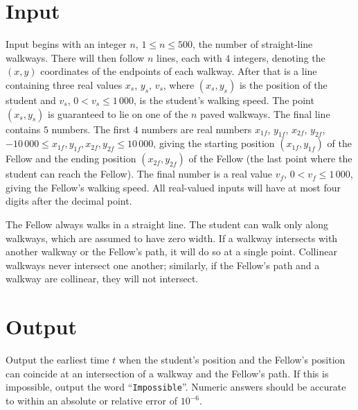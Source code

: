 \section* {Input}
Input begins with an integer $n$, $1 \le n \le 500$, the number of straight-line walkways. There will then follow $n$ lines, each with $4$ integers, denoting the $(x,y)$ coordinates of the endpoints of each walkway. After that is a line containing three real values $x_s$, $y_s$, $v_s$, where $(x_s,y_s)$ is the position of the student and $v_s$, $0 < v_s \leq 1\,000$, is the student's walking
speed. The point $(x_s,y_s)$ is guaranteed to lie on one of the $n$ paved walkways. The final line contains $5$ numbers. The first $4$ numbers are real numbers $x_{1f}$, $y_{1f}$, $x_{2f}$, $y_{2f}$, $-10\,000 \le x_{1f}, y_{1f},x_{2f},y_{2f} \le 10\,000$, giving the starting position $(x_{1f}, y_{1f})$ of the Fellow and the ending position $(x_{2f}, y_{2f})$ of the Fellow (the last point where the student can reach the Fellow). The final number is a real value $v_f$, $0 < v_f \leq 1\,000$, giving the Fellow's walking speed. All real-valued inputs will have at most four digits after the decimal point.

The Fellow always walks in a straight line.  The student can walk only along walkways, which are assumed to have zero width. If a walkway intersects with another walkway or the Fellow's path, it will do so at a single point. Collinear walkways never intersect one another; similarly, if the Fellow's path and a walkway are collinear, they will not intersect.

\section* {Output}
Output the earliest time $t$ when the student's position and the Fellow's position can coincide at an intersection of a walkway and the Fellow's path. If this is impossible, output the word ``\texttt{Impossible}''. Numeric answers should be
 accurate to within an absolute or relative error of $10^{-6}$.
